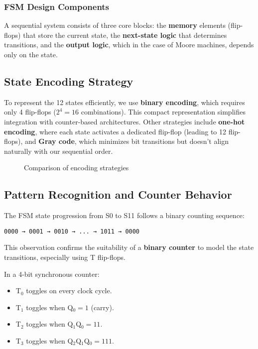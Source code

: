 \documentclass[10pt,a4paper]{article}
\begin{document}
\subsubsection*{FSM Design Components}

A sequential system consists of three core blocks: the \textbf{memory} elements (flip-flops) that store the current state, the \textbf{next-state logic} that determines transitions, and the \textbf{output logic}, which in the case of Moore machines, depends only on the state.

\subsection*{State Encoding Strategy}

To represent the 12 states efficiently, we use \textbf{binary encoding}, which requires only 4 flip-flops ($2^4 = 16$ combinations). This compact representation simplifies integration with counter-based architectures. Other strategies include \textbf{one-hot encoding}, where each state activates a dedicated flip-flop (leading to 12 flip-flops), and \textbf{Gray code}, which minimizes bit transitions but doesn’t align naturally with our sequential order.

\begin{figure}[H]
\centering
{}
\caption{Comparison of encoding strategies}
\end{figure}

\subsection*{Pattern Recognition and Counter Behavior}

The FSM state progression from S0 to S11 follows a binary counting sequence:

\begin{verbatim}
0000 → 0001 → 0010 → ... → 1011 → 0000
\end{verbatim}

This observation confirms the suitability of a \textbf{binary counter} to model the state transitions, especially using T flip-flops.

In a 4-bit synchronous counter:
\begin{itemize}
\item T$_0$ toggles on every clock cycle.
\item T$_1$ toggles when Q$_0 = 1$ (carry).
\item T$_2$ toggles when Q$_1$Q$_0 = 11$.
\item T$_3$ toggles when Q$_2$Q$_1$Q$_0 = 111$.
\end{itemize}
\end{document}

